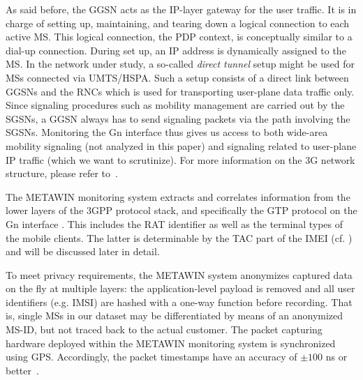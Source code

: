 As said before, the \ac{GGSN} acts as the IP-layer gateway for the user traffic. It is in charge of setting up,
maintaining, and tearing down a logical connection to each active \ac{MS}. This logical connection, the \ac{PDP} context,
is conceptually similar to a dial-up connection. During set up, an
IP address is dynamically assigned to the \ac{MS}.
In the network under study, a so-called \textit{direct tunnel} setup might be used for \acp{MS} connected
via \ac{UMTS}/\ac{HSPA}. Such a setup consists of a direct link between \acp{GGSN} and the
\acp{RNC} %
which is used for
transporting user-plane data traffic only. Since signaling procedures such
as mobility management are carried out by the \acp{SGSN}, a \ac{GGSN} always has to send signaling packets
via the path involving the \acp{SGSN}. Monitoring the Gn interface thus gives us access to both wide-area mobility signaling (not analyzed in this paper) %
and signaling related to user-plane IP traffic (which we want to scrutinize).
For more information on the \ac{3G} network structure, please refer to~\cite{bannister_convergence_2004}.

The METAWIN monitoring system extracts and correlates information from the lower
layers of the \ac{3GPP} protocol stack, and specifically the \ac{GTP} protocol
on the Gn interface \cite{3gpp129.060}. This includes the \acf{RAT} identifier as well as the terminal types of the mobile clients. The
latter is determinable by the \acf{TAC} part of the \acf{IMEI} (cf. \cite{3gpp23.003}) and will be discussed later in detail.

To meet privacy requirements, the METAWIN system anonymizes captured data on the fly at multiple
layers: the application-level payload is removed and all user identifiers (e.g. \ac{IMSI}) are
hashed with a one-way function before recording. That is, single
\acp{MS} in our dataset may be differentiated by means of an anonymized \ac{MS-ID}, but not traced back to the actual customer.
The packet capturing hardware deployed within the METAWIN monitoring system is synchronized
using \ac{GPS}. Accordingly, the packet timestamps
have an accuracy of $\pm100$ ns or better~\cite[p.97-98]{donnelly_high_2002}.



